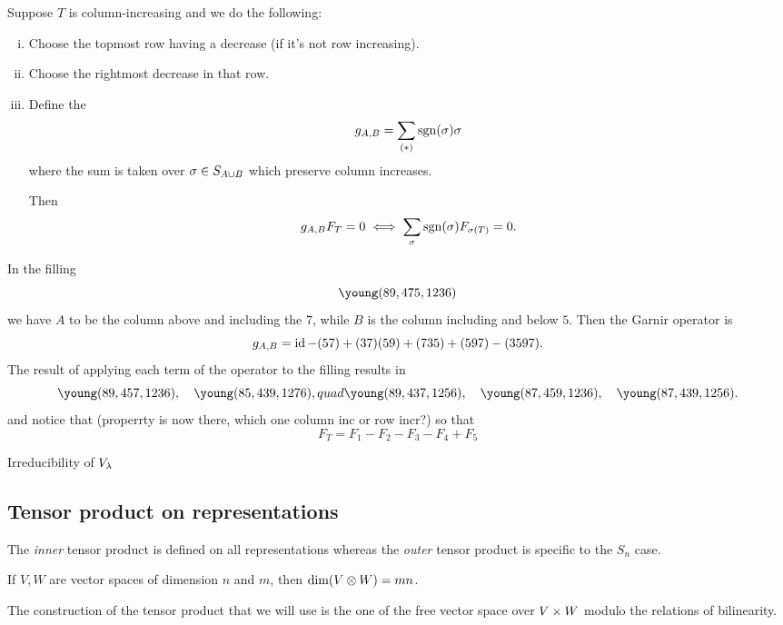 \documentclass[12pt]{memoir}
\begin{document}
\begin{Lem}
    Suppose $T$ is column-increasing and we do the following:
    \begin{enumerate}[i)]
        \itemsep=-0.4em
        \item Choose the topmost row having a decrease (if it's not row increasing).
        \item Choose the rightmost decrease in that row.
        \item Define the 
        $$g_{A,B}=\sum_{(\ast)}\operatorname{sgn}(\sigma)\sigma$$
        where the sum is taken over $\sigma\in S_{A\cup B}$ which preserve column increases.\par 
        Then 
        $$g_{A,B}F_T=0\iff \sum_\sigma\operatorname{sgn}(\sigma)F_{\sigma(T)}=0.$$
    \end{enumerate}
\end{Lem}

\begin{Ex}
    In the filling  
    $$\young(89,475,1236)$$
    we have $A$ to be the column above and including the $7$, while $B$ is the column including and below $5$. Then the Garnir operator is 
    $$g_{A,B}=\operatorname{id}-(57)+(37)(59)+(735)+(597)-(3597).$$
    The result of applying each term of the operator to the filling results in 
    $$\young(89,457,1236),\quad\young(85,439,1276),quad\young(89,437,1256),\quad\young(87,459,1236),\quad\young(87,439,1256).$$
    and notice that (properrty is now there, which one column inc or row incr?) so that 
    $$F_T=F_1-F_2-F_3-F_4+F_5$$
\end{Ex}

\begin{Prop}
    Irreducibility of $V_\lambda$
\end{Prop}

\subsection{Tensor product on representations}

The \emph{inner} tensor product is defined on all representations whereas the \emph{outer} tensor product is specific to the $S_n$ case. 

\begin{Prop}
    If $V,W$ are vector spaces of dimension $n$ and $m$, then $\dim(V\otimes W)=mn$.   
\end{Prop}

The construction of the tensor product that we will use is the one of the free vector space over $V\times W$ modulo the relations of bilinearity.
\end{document}
